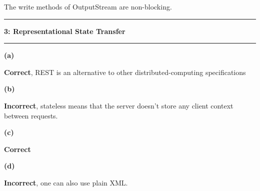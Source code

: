 \documentclass[11pt]{article}
\newcommand\question[2]{\vspace{.25in}\hrule\textbf{#1: #2}\vspace{.5em}\hrule\vspace{.10in}}
\renewcommand\part[1]{\vspace{.10in}\textbf{(#1)}}
\begin{document}
\begin{itemize}
The write methods of OutputStream are non-blocking.

\question{3}{Representational State Transfer}

\part{a}

\textbf{Correct}, REST is an alternative to other distributed-computing specifications

\part{b}

\textbf{Incorrect}, stateless means that the server doesn't store any client context between requests.

\part{c}

\textbf{Correct}

\part{d}

\textbf{Incorrect}, one can also use plain XML.
	
\end{itemize}
\end{document}
